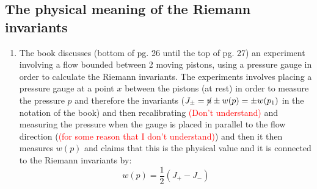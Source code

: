 ﻿\documentclass[11pt]{article}
\begin{document}
\subsection{The physical meaning of the Riemann invariants}
\begin{enumerate}
  \item The book discusses (bottom of pg. 26 until the top of pg. 27) an experiment involving a flow bounded between 2 moving pistons, using a pressure gauge in order to calculate the Riemann invariants.
  The experiments involves placing a pressure gauge at a point $x$ between the pistons (at rest) in order to measure the pressure $p$ and therefore the invariants ($J_\pm = \cancel{u} \pm w(p) = \pm w(p_1)$ in the notation of the book) and then recalibrating \textcolor{red}{(Don't understand)} and measuring the pressure when the gauge is placed in parallel to the flow direction (\textcolor{red}{(for some reason that I don't understand)}) and then it then measures $w(p)$ and claims that this is the physical value and it is connected to the Riemann invariants by:
  \begin{equation}
    w(p) = \frac{1}{2} (J_+ - J_-)
  \end{equation}
  \end{enumerate}
\end{document}
